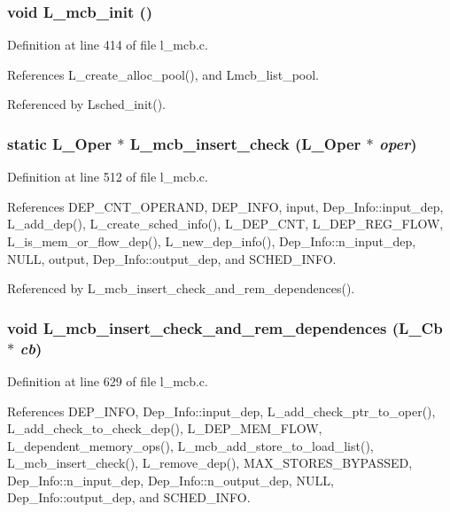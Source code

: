 \subsubsection{\setlength{\rightskip}{0pt plus 5cm}void L\_\-mcb\_\-init ()}\label{l__mcb_8c_072c41f7e97e34203efbc40f1714b2a7}




Definition at line 414 of file l\_\-mcb.c.

References L\_\-create\_\-alloc\_\-pool(), and Lmcb\_\-list\_\-pool.

Referenced by Lsched\_\-init().
\subsubsection{\setlength{\rightskip}{0pt plus 5cm}static L\_\-Oper $\ast$ L\_\-mcb\_\-insert\_\-check (L\_\-Oper $\ast$ {\em oper})\hspace{0.3cm}{\tt  [static]}}\label{l__mcb_8c_f411e7eb7027b50b7b7b6a3400d6b69f}




Definition at line 512 of file l\_\-mcb.c.

References DEP\_\-CNT\_\-OPERAND, DEP\_\-INFO, input, Dep\_\-Info::input\_\-dep, L\_\-add\_\-dep(), L\_\-create\_\-sched\_\-info(), L\_\-DEP\_\-CNT, L\_\-DEP\_\-REG\_\-FLOW, L\_\-is\_\-mem\_\-or\_\-flow\_\-dep(), L\_\-new\_\-dep\_\-info(), Dep\_\-Info::n\_\-input\_\-dep, NULL, output, Dep\_\-Info::output\_\-dep, and SCHED\_\-INFO.

Referenced by L\_\-mcb\_\-insert\_\-check\_\-and\_\-rem\_\-dependences().
\subsubsection{\setlength{\rightskip}{0pt plus 5cm}void L\_\-mcb\_\-insert\_\-check\_\-and\_\-rem\_\-dependences (L\_\-Cb $\ast$ {\em cb})}\label{l__mcb_8c_b74980959bae37f721bec075fe9171ba}




Definition at line 629 of file l\_\-mcb.c.

References DEP\_\-INFO, Dep\_\-Info::input\_\-dep, L\_\-add\_\-check\_\-ptr\_\-to\_\-oper(), L\_\-add\_\-check\_\-to\_\-check\_\-dep(), L\_\-DEP\_\-MEM\_\-FLOW, L\_\-dependent\_\-memory\_\-ops(), L\_\-mcb\_\-add\_\-store\_\-to\_\-load\_\-list(), L\_\-mcb\_\-insert\_\-check(), L\_\-remove\_\-dep(), MAX\_\-STORES\_\-BYPASSED, Dep\_\-Info::n\_\-input\_\-dep, Dep\_\-Info::n\_\-output\_\-dep, NULL, Dep\_\-Info::output\_\-dep, and SCHED\_\-INFO.

